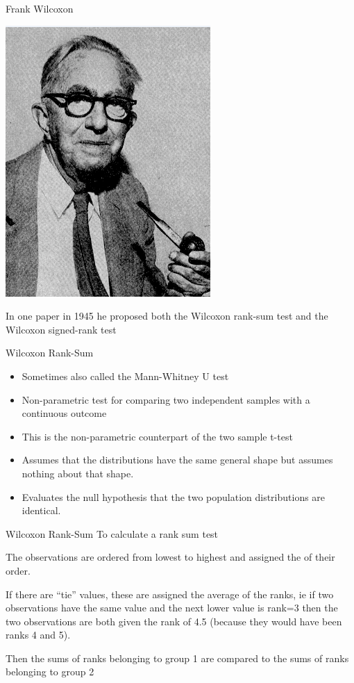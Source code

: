 \documentclass[
  ignorenonframetext,
  aspectratio=169]{beamer}
\providecommand{\tightlist}{%
  \setlength{\itemsep}{0pt}\setlength{\parskip}{0pt}}
\renewcommand{\textbf}{\structure}
\begin{document}
\begin{frame}{Frank Wilcoxon}
\protect\hypertarget{frank-wilcoxon}{}
\begin{center}\includegraphics[width=0.6\linewidth]{./images/wilcox} \end{center}

In one paper in 1945 he proposed both the Wilcoxon rank-sum test and the
Wilcoxon signed-rank test
\end{frame}

\begin{frame}{Wilcoxon Rank-Sum}
\protect\hypertarget{wilcoxon-rank-sum}{}
\begin{itemize}
\tightlist
\item
  Sometimes also called the Mann-Whitney U test
\item
  Non-parametric test for comparing two independent samples with a
  continuous outcome
\item
  This is the non-parametric counterpart of the two sample t-test
\item
  Assumes that the distributions have the same general shape but assumes
  nothing about that shape.\\
\item
  Evaluates the null hypothesis that the two population distributions
  are identical.
\end{itemize}
\end{frame}

\begin{frame}{Wilcoxon Rank-Sum}
\protect\hypertarget{wilcoxon-rank-sum-1}{}
To calculate a rank sum test

The observations are ordered from lowest to highest and assigned the
\textbf{rank} of their order.

If there are ``tie'' values, these are assigned the average of the
ranks, ie if two observations have the same value and the next lower
value is rank=3 then the two observations are both given the rank of 4.5
(because they would have been ranks 4 and 5).

Then the sums of ranks belonging to group 1 are compared to the sums of
ranks belonging to group 2
\end{frame}
\end{document}
